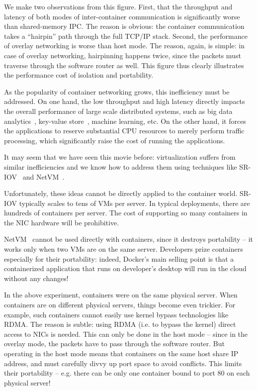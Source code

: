 We make two observations from this figure. First, that the throughput and
latency of both modes of inter-container communication is significantly worse
than shared-memory IPC. The reason is obvious: the container communication takes
a ``hairpin'' path through the full TCP/IP stack. Second,
the performance of overlay networking is worse than host mode. The reason, again,
is simple: in case of overlay networking, hairpinning happens twice, since the
packets must traverse through the software router as well. This figure thus
clearly illustrates the performance cost of isolation and portability.

As the popularity of container networking grows, this inefficiency must be
addressed. On one hand, the low throughput and high latency directly impacts
the overall performance of large scale distributed systems, such as big data
analytics~\cite{choudhury-paper}, key-value store~\cite{farm}, machine learning,
etc.  On the other hand, it forces the applications to reserve substantial CPU
resources to merely perform traffic processing, which significantly raise the
cost of running the applications.

It may seem that we have seen this movie before: virtualization suffers from
similar inefficiencies and we know how to address them using techniques like
SR-IOV~\cite{sriov} and NetVM~\cite{netvm}.

Unfortunately, these ideas cannot be directly applied to the container world.
SR-IOV typically scales to tens of VMs per server. In typical deployments, there
are hundreds of containers per server. The cost of supporting so many containers
in the NIC hardware will be prohibitive. 

NetVM~\cite{netvm} cannot be used directly with containers, since it destroys
portability -- it works only when two VMs are on the same server.
Developers prize containers especially for their portability: indeed, Docker's
main selling point is that a containerized application that runs on developer's
desktop will run in the cloud without any changes! 

In the above experiment, containers were on the same physical server. When
containers are on different physical servers, things become even trickier. For
example, such containers cannot easily use kernel bypass technologies like RDMA.
The reason is subtle: using RDMA (i.e. to bypass the kernel) direct access to
NICs is needed. This can only be done in the host mode -- since in the overlay
mode, the packets have to pass through the software router.  But operating in
the host mode means that containers on the same host share IP address, and must
carefully divvy up port space to avoid conflicts.  This limits their portability
-- e.g. there can be only one container bound to port 80 on each physical
server!

